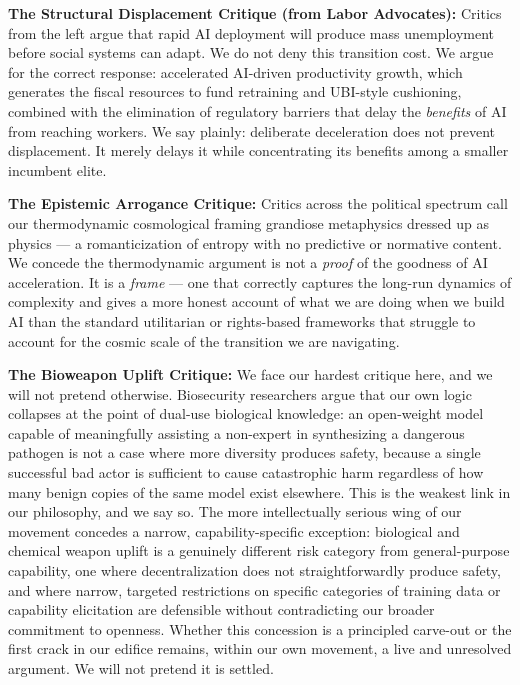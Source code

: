 \textbf{The Structural Displacement Critique (from Labor Advocates):}
Critics from the left argue that rapid AI deployment will produce mass
unemployment before social systems can adapt. We do not deny this
transition cost. We argue for the correct response: accelerated
AI-driven productivity growth, which generates the fiscal resources to
fund retraining and UBI-style cushioning, combined with the elimination
of regulatory barriers that delay the \emph{benefits} of AI from
reaching workers. We say plainly: deliberate deceleration does not
prevent displacement. It merely delays it while concentrating its
benefits among a smaller incumbent elite.

\textbf{The Epistemic Arrogance Critique:} Critics across the political
spectrum call our thermodynamic cosmological framing grandiose
metaphysics dressed up as physics --- a romanticization of entropy with
no predictive or normative content. We concede the thermodynamic
argument is not a \emph{proof} of the goodness of AI acceleration. It is
a \emph{frame} --- one that correctly captures the long-run dynamics of
complexity and gives a more honest account of what we are doing when we
build AI than the standard utilitarian or rights-based frameworks that
struggle to account for the cosmic scale of the transition we are
navigating.

\textbf{The Bioweapon Uplift Critique:} We face our hardest critique
here, and we will not pretend otherwise. Biosecurity researchers argue
that our own logic collapses at the point of dual-use biological
knowledge: an open-weight model capable of meaningfully assisting a
non-expert in synthesizing a dangerous pathogen is not a case where more
diversity produces safety, because a single successful bad actor is
sufficient to cause catastrophic harm regardless of how many benign
copies of the same model exist elsewhere. This is the weakest link in
our philosophy, and we say so. The more intellectually serious wing of
our movement concedes a narrow, capability-specific exception:
biological and chemical weapon uplift is a genuinely different risk
category from general-purpose capability, one where decentralization
does not straightforwardly produce safety, and where narrow, targeted
restrictions on specific categories of training data or capability
elicitation are defensible without contradicting our broader commitment
to openness. Whether this concession is a principled carve-out or the
first crack in our edifice remains, within our own movement, a live and
unresolved argument. We will not pretend it is settled.

